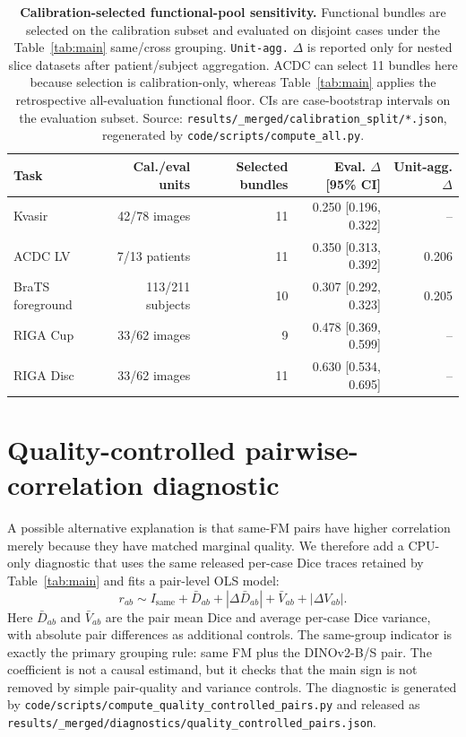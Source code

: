 \begin{table}[!htbp]
  \caption{\textbf{Calibration-selected functional-pool sensitivity.}
  Functional bundles are selected on the calibration subset and evaluated on
  disjoint cases under the Table~\ref{tab:main} same/cross grouping. \texttt{Unit-agg.}
  $\Delta$ is reported only for nested slice datasets after patient/subject aggregation.
  ACDC can select 11 bundles here because selection is calibration-only, whereas
  Table~\ref{tab:main} applies the retrospective all-evaluation functional floor.
  CIs are case-bootstrap intervals on the evaluation subset. Source:
  \texttt{results/\_merged/calibration\_split/*.json}, regenerated by
  \texttt{code/scripts/compute\_all.py}.}
  \label{tab:calibration-split}
  \centering\footnotesize
  \begin{tabular}{lrrrr}
    \toprule
    Task & Cal./eval units & Selected bundles & Eval. $\Delta$ [95\% CI] & Unit-agg. $\Delta$ \\
    \midrule
    Kvasir & 42/78 images & 11 & 0.250 [0.196, 0.322] & -- \\
    ACDC LV & 7/13 patients & 11 & 0.350 [0.313, 0.392] & 0.206 \\
    BraTS foreground & 113/211 subjects & 10 & 0.307 [0.292, 0.323] & 0.205 \\
    RIGA Cup & 33/62 images & 9 & 0.478 [0.369, 0.599] & -- \\
    RIGA Disc & 33/62 images & 11 & 0.630 [0.534, 0.695] & -- \\
    \bottomrule
  \end{tabular}
\end{table}

\section{Quality-controlled pairwise-correlation diagnostic}
\label{app:quality-controlled-pairs}

A possible alternative explanation is that same-FM pairs have higher correlation
merely because they have matched marginal quality. We therefore add a CPU-only
diagnostic that uses the same released per-case Dice traces retained by Table~\ref{tab:main}
and fits a pair-level OLS model:
\[
r_{ab} \sim I_{\mathrm{same}} + \bar D_{ab} + |\Delta \bar D_{ab}|
       + \bar V_{ab} + |\Delta V_{ab}|.
\]
Here $\bar D_{ab}$ and $\bar V_{ab}$ are the pair mean Dice and average
per-case Dice variance, with absolute pair differences as additional controls.
The same-group indicator is exactly the primary grouping rule: same FM plus the
DINOv2-B/S pair. The coefficient is not a causal estimand, but it checks that
the main sign is not removed by simple pair-quality and variance controls.
The diagnostic is generated by
\texttt{code/scripts/compute\_quality\_controlled\_pairs.py} and released as
\texttt{results/\_merged/diagnostics/quality\_controlled\_pairs.json}.

